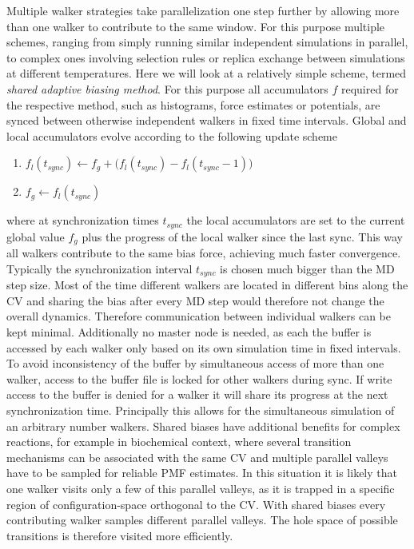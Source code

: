 Multiple walker strategies take parallelization one step further by allowing more than one walker to contribute to the same window.
For this purpose multiple schemes, ranging from simply running similar independent simulations in parallel, to complex ones involving selection rules or replica exchange between simulations at different temperatures.\autocite{wilson2011molecular,comer2014calculation,minoukadeh2010potential}
Here we will look at a relatively simple scheme, termed \textit{shared adaptive biasing method}.\autocite{comer2015adaptive}
For this purpose all accumulators $f$ required for the respective method, such as histograms, force estimates or potentials, are synced between otherwise independent walkers in fixed time intervals. Global and local accumulators evolve according to the following update scheme
\begin{enumerate}
  \item $f_{l}(t_{sync}) \leftarrow f_{g} + \biggl(f_{l}(t_{sync})-f_{l}(t_{sync}-1) \biggr)$
  \item $f_{g} \leftarrow f_{l}(t_{sync})$
\end{enumerate}
where at synchronization times $t_{sync}$ the local accumulators are set to the current global value $f_{g}$ plus the progress of the local walker since the last sync.
This way all walkers contribute to the same bias force, achieving much faster convergence.
Typically the synchronization interval $t_{sync}$ is chosen much bigger than the MD step size. Most of the time different walkers are located in different bins along the CV and sharing the bias after every MD step would therefore not change the overall dynamics.
Therefore communication between individual walkers can be kept minimal.
Additionally no master node is needed, as each the buffer is accessed by each walker only based on its own simulation time in fixed intervals.
To avoid inconsistency of the buffer by simultaneous access of more than one walker, access to the buffer file is locked for other walkers during sync.
If write access to the buffer is denied for a walker it will share its progress at the next synchronization time.
Principally this allows for the simultaneous simulation of an arbitrary number walkers.
Shared biases have additional benefits for complex reactions, for example in biochemical context, where several transition mechanisms can be associated with the same CV and multiple parallel valleys have to be sampled for reliable PMF estimates.
In this situation it is likely that one walker visits only a few of this parallel valleys, as it is trapped in a specific region of configuration-space orthogonal to the CV.
With shared biases every contributing walker samples different parallel valleys.
The hole space of possible transitions is therefore visited more efficiently.\autocite{minoukadeh2010potential}


